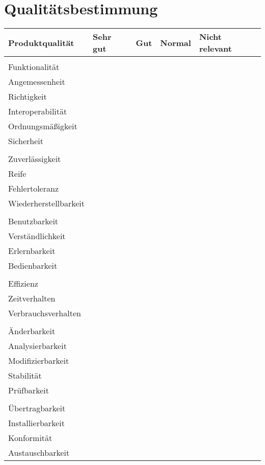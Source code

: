 \documentclass[pflichtenheft.tex]{subfiles}
\begin{document}
\chapter{Qualitätsbestimmung}

\begin{table}
\begin{tabular}{ | l | p{2.5cm} | p{2.5cm} | p{2.5cm} | p{2.5cm} | }
    \hline
    \textbf{Produktqualität} & \textbf{Sehr gut} & \textbf{Gut} & \textbf{Normal} & 
    	\textbf{Nicht relevant}\\ \hline
    &&&& \\
    \Large{Funktionalität}	&  &  &  &  \\    \hline
    Angemessenheit 			&  &  &  &  \\    \hline
    Richtigkeit    			&  &  &  &  \\    \hline
    Interoperabilität   	&  &  &  &  \\    \hline
    Ordnungsmäßigkeit		&  &  &  &  \\    \hline
    Sicherheit				&  &  &  &  \\    \hline
    &&&& \\
    \Large{Zuverlässigkeit}  &  &  &  &  \\    \hline
    Reife					&  &  &  &  \\    \hline
    Fehlertoleranz			&  &  &  &  \\    \hline
    Wiederherstellbarkeit	&  &  &  &  \\    \hline
    &&&& \\
    \Large{Benutzbarkeit}	&  &  &  &  \\    \hline
    Verständlichkeit		&  &  &  &  \\    \hline
    Erlernbarkeit			&  &  &  &  \\    \hline
    Bedienbarkeit			&  &  &  &  \\    \hline
    &&&& \\
    \Large{Effizienz}		&  &  &  &  \\    \hline
    Zeitverhalten			&  &  &  &  \\    \hline
    Verbrauchsverhalten		&  &  &  &  \\    \hline
    &&&& \\
    \Large{Änderbarkeit}	&  &  &  &  \\    \hline
    Analysierbarkeit		&  &  &  &  \\    \hline
    Modifizierbarkeit		&  &  &  &  \\    \hline
    Stabilität				&  &  &  &  \\    \hline
    Prüfbarkeit				&  &  &  &  \\    \hline
    &&&& \\
    \Large{Übertragbarkeit}	&  &  &  &  \\    \hline
    Installierbarkeit		&  &  &  &  \\    \hline
    Konformität				&  &  &  &  \\    \hline
    Austauschbarkeit		&  &  &  &  \\    \hline
    
    
\end{tabular}
\end{table}
\end{document}
